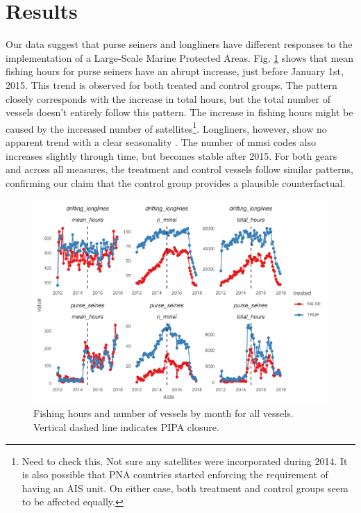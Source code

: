 \documentclass[12pt,]{article}
\let\rmarkdownfootnote\footnote%
\def\footnote{\protect\rmarkdownfootnote}
\begin{document}
\clearpage

\hypertarget{results}{%
\section{Results}\label{results}}

Our data suggest that purse seiners and longliners have different
responses to the implementation of a Large-Scale Marine Protected Areas.
Fig. \ref{fig:all_vessels} shows that mean fishing hours for purse
seiners have an abrupt increase, just before January 1st, 2015. This
trend is observed for both treated and control groups. The pattern
closely corresponds with the increase in total hours, but the total
number of vessels doesn't entirely follow this pattern. The increase in
fishing hours might be caused by the increased number of
satellites\footnote{Need to check this. Not sure any satellites were
  incorporated during 2014. It is also possible that PNA countries
  started enforcing the requirement of having an AIS unit. On either
  case, both treatment and control groups seem to be affected equally.}.
Longliners, however, show no apparent trend with a clear seasonality
\citep{ortuocrespo_2018}. The number of mmsi codes also increases
slightly through time, but becomes stable after 2015. For both gears and
across all measures, the treatment and control vessels follow similar
patterns, confirming our claim that the control group provides a
plausible counterfactual.

\begin{figure}
\centering
\includegraphics{Manuscript_files/figure-latex/unnamed-chunk-9-1.pdf}
\caption{\label{fig:unnamed-chunk-9}\label{fig:all_vessels}Fishing hours and
number of vessels by month for all vessels. Vertical dashed line
indicates PIPA closure.}
\end{figure}
\end{document}
